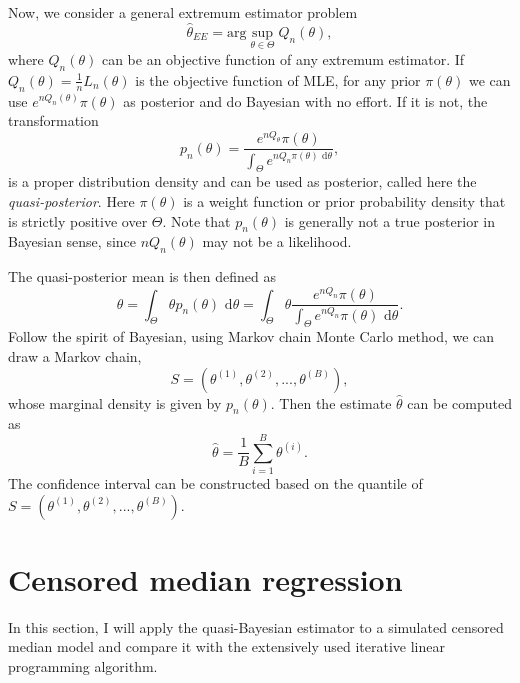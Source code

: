 \documentclass[12pt]{article}
\theoremstyle{plain} \newtheorem{theorem}{Theorem}
\theoremstyle{definition} \newtheorem{definition}{Definition}
\begin{document}
Now, we consider a general extremum estimator problem
\begin{equation*}
    \hat{\theta}_{EE} = \mathrm{arg}\sup_{\theta\in\Theta}Q_n(\theta),
\end{equation*}
where $Q_n(\theta)$ can be an objective function of any extremum
estimator.  If $Q_n(\theta) = \frac{1}{n}L_n(\theta)$ is the objective
function of MLE, for any prior $\pi(\theta)$ we can use
$e^{nQ_n(\theta)}\pi(\theta)$ as posterior and do Bayesian with no
effort. If it is not, the transformation
\begin{equation*}
    p_n(\theta) = \frac{e^{nQ_{\theta}}\pi(\theta)}{\int_{\Theta}e^{nQ_n\pi(\theta)\mbox{ d}\theta}},
\end{equation*}
is a proper distribution density and can be used as posterior, called
here the \textit{quasi-posterior}. Here $\pi(\theta)$ is a weight
function or prior probability density that is strictly positive over
$\Theta$. Note that $p_n(\theta)$ is generally not a true posterior in
Bayesian sense, since $nQ_n(\theta)$ may not be a likelihood.

The quasi-posterior mean is then defined as
\begin{equation*}
    \hat{\theta} = \int_{\Theta} \theta p_n(\theta)\mbox{ d}\theta =  \int_{\Theta} \theta\frac{e^{nQ_n}\pi(\theta)}{\int_{\Theta}e^{nQ_n}\pi(\theta)\mbox{ d}\theta}.
\end{equation*}
Follow the spirit of Bayesian, using Markov chain Monte Carlo method,
we can draw a Markov chain,
\begin{equation*}
    S = (\theta^{(1)},\theta^{(2)},...,\theta^{(B)}),
\end{equation*}
whose marginal density is given by $p_n(\theta)$. Then the estimate
$\hat{\theta}$ can be computed as
\begin{equation*}
    \hat{\theta} = \frac{1}{B}\sum\limits_{i=1}^B\theta^{(i)}.
\end{equation*}
The confidence interval can be constructed based on the quantile of
$S = (\theta^{(1)},\theta^{(2)},...,\theta^{(B)})$.

\section{Censored median regression}
\label{sec:censored-model}
In this section, I will apply the quasi-Bayesian estimator to a
simulated censored median model and compare it with the extensively
used iterative linear programming algorithm.
\end{document}
